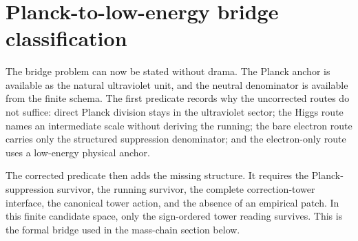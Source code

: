 \documentclass[11pt]{article}
\begin{document}
\begin{code}
\>[0][@{}l@{\AgdaIndent{0}}]%
\>[2]\<%
\\
\>[2][@{}l@{\AgdaIndent{0}}]%
\>[4]%
\>[24]\AgdaSymbol{:}\AgdaSpace{}%
\<%
\\
%
\>[4]%
\>[24]\AgdaSymbol{:}\AgdaSpace{}%
\<%
\\
%
\>[4]%
\>[24]\AgdaSymbol{:}\AgdaSpace{}%
\AgdaSpace{}%
\AgdaSpace{}%
\<%
\\
%
\\[\AgdaEmptyExtraSkip]%
\>[0]\AgdaSpace{}%
\AgdaSymbol{:}\AgdaSpace{}%
\<%
\\
\>[0]\AgdaSpace{}%
\AgdaSymbol{=}\AgdaSpace{}%
\<%
\\
\>[0][@{}l@{\AgdaIndent{0}}]%
\>[2]\AgdaSymbol{\{}\AgdaSpace{}%
%
\>[23]\AgdaSymbol{=}\AgdaSpace{}%
\<%
\\
%
\>[2]\AgdaSymbol{;}\AgdaSpace{}%
%
\>[23]\AgdaSymbol{=}\AgdaSpace{}%
\<%
\\
%
\>[2]\AgdaSymbol{;}\AgdaSpace{}%
\AgdaSpace{}%
\AgdaSymbol{=}\AgdaSpace{}%
\<%
\\
%
\>[2]\AgdaSymbol{\}}\<%
\end{code}

\section{Planck-to-low-energy bridge classification}

The bridge problem can now be stated without drama.  The Planck anchor
is available as the natural ultraviolet unit, and the neutral denominator
is available from the finite schema.  The first predicate records why the
uncorrected routes do not suffice: direct Planck division stays in the
ultraviolet sector; the Higgs route names an intermediate scale without
deriving the running; the bare electron route carries only the structured
suppression denominator; and the electron-only route uses a low-energy
physical anchor.

The corrected predicate then adds the missing structure.  It requires
the Planck-suppression survivor, the running survivor, the complete
correction-tower interface, the canonical tower action, and the absence
of an empirical patch.  In this finite candidate space, only the
sign-ordered tower reading survives.  This is the formal bridge used in
the mass-chain section below.
\end{document}
